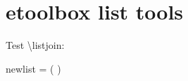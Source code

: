 \documentclass[12pt,\documentclassflag]{lawbrief}
\begin{document}
  \section{etoolbox list tools}
  
  \begin{LTXexample}
    \renewcommand\do[1]{hello (#1)\par}
    \renewcommand\do[1]{\listadd{\hellolist}{hello (#1)}}
    \providecommand\listjoin[2][,]{{%
        \makeatletter\def\separator@{\empty}%
        \renewcommand\do[1]{\separator@##1\def\separator@{#1}}%
        \dolistloop{#2}}}

    Test \textbackslash listjoin:
    \listjoin{\hellolist}

    newlist = (\listjoin{\newlist}) 
  \end{LTXexample}

  
    \newcommand\poplist[1]{{%
        \def\poplisti##1\listseparator##2\endlist{##1}%
        \expandafter\poplisti#1\listseparator\endlist}}
    

    



    
\end{document}
